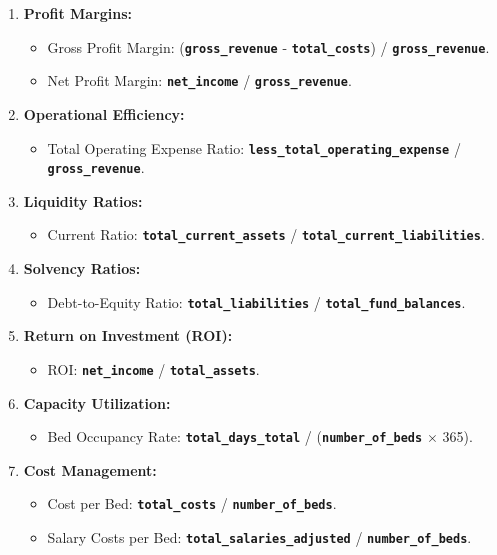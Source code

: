 \documentclass{article}
\theoremstyle{mytheoremstyle}
\theoremstyle{mytheoremstyle}
\theoremstyle{myproblemstyle}
\begin{document}
\begin{enumerate}
    \item \textbf{Profit Margins:}
    \begin{itemize}
        \item Gross Profit Margin: (\textbf{\texttt{gross\_revenue}} - \textbf{\texttt{total\_costs}}) / \textbf{\texttt{gross\_revenue}}.
        \item Net Profit Margin: \textbf{\texttt{net\_income}} / \textbf{\texttt{gross\_revenue}}.
    \end{itemize}
    
    \item \textbf{Operational Efficiency:}
    \begin{itemize}
        \item Total Operating Expense Ratio: \textbf{\texttt{less\_total\_operating\_expense}} / \textbf{\texttt{gross\_revenue}}.
    \end{itemize}
    
    \item \textbf{Liquidity Ratios:}
    \begin{itemize}
        \item Current Ratio: \textbf{\texttt{total\_current\_assets}} / \textbf{\texttt{total\_current\_liabilities}}.
    \end{itemize}
    
    \item \textbf{Solvency Ratios:}
    \begin{itemize}
        \item Debt-to-Equity Ratio: \textbf{\texttt{total\_liabilities}} / \textbf{\texttt{total\_fund\_balances}}.
    \end{itemize}
    
    \item \textbf{Return on Investment (ROI):}
    \begin{itemize}
        \item ROI: \textbf{\texttt{net\_income}} / \textbf{\texttt{total\_assets}}.
    \end{itemize}
    
    \item \textbf{Capacity Utilization:}
    \begin{itemize}
        \item Bed Occupancy Rate: \textbf{\texttt{total\_days\_total}} / (\textbf{\texttt{number\_of\_beds}} $\times$ 365).
    \end{itemize}
    
    \item \textbf{Cost Management:}
    \begin{itemize}
        \item Cost per Bed: \textbf{\texttt{total\_costs}} / \textbf{\texttt{number\_of\_beds}}.
        \item Salary Costs per Bed: \textbf{\texttt{total\_salaries\_adjusted}} / \textbf{\texttt{number\_of\_beds}}.
    \end{itemize}
\end{enumerate}
\end{document}

